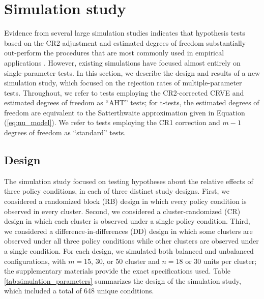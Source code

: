 \documentclass[12pt]{article}\usepackage[]{graphicx}\usepackage[]{color}
\begin{document}
\section{Simulation study}
\label{sec:simulation}

Evidence from several large simulation studies indicates that hypothesis tests based on the CR2 adjustment and estimated degrees of freedom substantially out-perform the procedures that are most commonly used in empirical applications \citep[][]{Cameron2015practitioners, Imbens2015robust,Bell2002bias}.
However, existing simulations have focused almost entirely on single-parameter tests. 
In this section, we describe the design and results of a new simulation study, which focused on the rejection rates of multiple-parameter tests.
Throughout, we refer to tests employing the CR2-corrected CRVE and estimated degrees of freedom as ``AHT'' tests; for t-tests, the estimated degrees of freedom are equivalent to the Satterthwaite approximation given in Equation (\ref{eq:nu_model}). 
We refer to tests employing the CR1 correction and $m - 1$ degrees of freedom as ``standard'' tests. 

\subsection{Design}

The simulation study focused on testing hypotheses about the relative effects of three policy conditions, in each of three distinct study designs. 
First, we considered a randomized block (RB) design in which every policy condition is observed in every cluster. 
Second, we considered a cluster-randomized (CR) design in which each cluster is observed under a single policy condition. 
Third, we considered a difference-in-differences (DD) design in which some clusters are observed under all three policy conditions while other clusters are observed under a single condition. 
For each design, we simulated both balanced and unbalanced configurations, with $m = 15$, 30, or 50 cluster and $n = 18$ or 30 units per cluster; 
the supplementary materials provide the exact specifications used. Table \ref{tab:simulation_parameters} summarizes the design of the simulation study, which included a total of 648 unique conditions.
\end{document}

